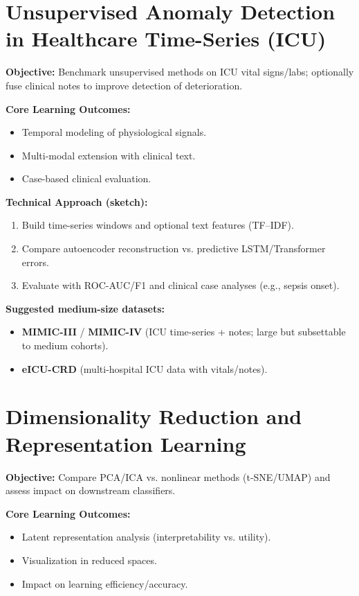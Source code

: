 \documentclass[11pt]{article}
\begin{document}
\section{Unsupervised Anomaly Detection in Healthcare Time-Series (ICU)}
\textbf{Objective:} Benchmark unsupervised methods on ICU vital signs/labs; optionally fuse clinical notes to improve detection of deterioration.

\textbf{Core Learning Outcomes:}
\begin{itemize}[leftmargin=2em]
  \item Temporal modeling of physiological signals.
  \item Multi-modal extension with clinical text.
  \item Case-based clinical evaluation.
\end{itemize}

\textbf{Technical Approach (sketch):}
\begin{enumerate}[leftmargin=2em]
  \item Build time-series windows and optional text features (TF--IDF).
  \item Compare autoencoder reconstruction vs. predictive LSTM/Transformer errors.
  \item Evaluate with ROC-AUC/F1 and clinical case analyses (e.g., sepsis onset).
\end{enumerate}

\textbf{Suggested medium-size datasets:}
\begin{itemize}[leftmargin=2em]
  \item \textbf{MIMIC-III} / \textbf{MIMIC-IV} (ICU time-series + notes; large but subsettable to medium cohorts).
  \item \textbf{eICU-CRD} (multi-hospital ICU data with vitals/notes).
\end{itemize}


\section{Dimensionality Reduction and Representation Learning}
\textbf{Objective:} Compare PCA/ICA vs. nonlinear methods (t-SNE/UMAP) and assess impact on downstream classifiers.

\textbf{Core Learning Outcomes:}
\begin{itemize}[leftmargin=2em]
  \item Latent representation analysis (interpretability vs. utility).
  \item Visualization in reduced spaces.
  \item Impact on learning efficiency/accuracy.
\end{itemize}
\end{document}
